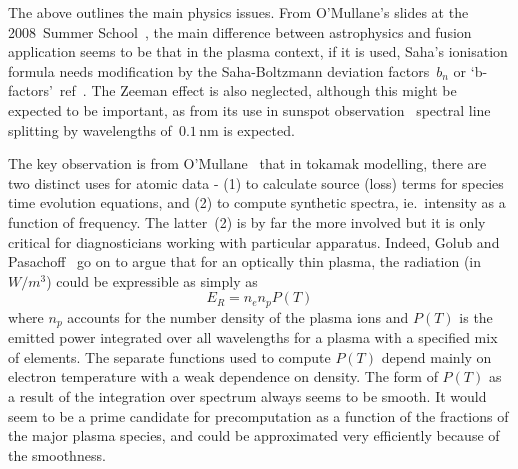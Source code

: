 The above outlines the main physics issues. From O'Mullane's slides at the 2008~Summer School~\cite{omullane},
the main difference between astrophysics and fusion
application seems to be that in the plasma context, if it is used, Saha's ionisation
formula needs modification by the Saha-Boltzmann
deviation factors~$b_n$ or `b-factors'~ref~\cite[slide 21]{omullane}.  The Zeeman effect is also neglected,
although this  might be expected to be important,
as from its use in sunspot observation~\cite[\S\,5.2]{brayloughhead} spectral line splitting
by wavelengths of~$0.1$\,nm is expected.

The key observation is from O'Mullane~\cite{omullane}
that in tokamak modelling, there are two distinct
uses for atomic data - (1) to calculate source (loss) terms for species
time evolution equations, and (2) to compute synthetic spectra, ie.\ intensity as a function
of frequency. The latter~(2) is by far the more involved but it is only critical for diagnosticians
working with particular apparatus.
Indeed, Golub and Pasachoff~\cite[\S\,3.3.2]{golubpasachoff} go on to 
argue that for an optically thin plasma, the radiation (in $W/m^3$)  could be 
expressible as simply as
\begin{equation} \label{eq:erad}
E_R = n_e  n_p  P(T)
\end{equation}
where $n_p$ accounts for the number density of the plasma
ions and $P(T)$ is the emitted power integrated over all wavelengths for a plasma
with a specified mix of elements. 
The separate functions used to compute $P(T)$ depend mainly on electron temperature
with a weak dependence on density. The form of $P(T)$ as a result of the 
integration over spectrum always seems to be smooth. It would seem to
be a prime candidate for precomputation as a function of the fractions of
the major plasma species, and could be approximated very efficiently because
of the smoothness.

